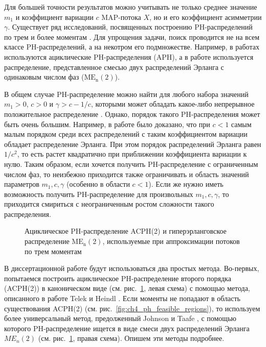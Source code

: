 Для большей точности результатов можно учитывать не только среднее значение $m_1$ и коэффициент вариации $c$ MAP-потока $X$, но и его коэффициент асимметрии $\gamma$. Существует ряд исследований, посвященных построению PH-распределений по трем и более моментам \cite{Osogami2006,Bobbio2005,Johnson1989,Telek2003,Horvath2013a,VandenBosch2000,Horvath2007,Schmickler1992}. Для упрощения задачи, поиск проводится не на всем классе PH-распределений, а на некотром его подмножестве. Например, в работах \cite{Bobbio2005,Telek2003} используются ациклические PH-распределения (APH), а в работе \cite{Johnson1989} используется распределение, представленное смесью двух распределений Эрланга с одинаковым числом фаз ($\text{ME}_\text{n}(2)$).

В общем случае PH-распределение можно найти для любого набора значений $m_1 > 0$, $c > 0$ и $\gamma > c - 1/c$, которыми может обладать какое-либо непрерывное положительное распределение \cite{Johnson1989}. Однако, порядок такого PH-распределения может быть очень большим. Например, в работе \cite{Aldous1987} было доказано, что при $c < 1$ самым малым порядком среди всех распределений с таким коэффициентом вариации  обладает распределение Эрланга. При этом порядок распределений Эрланга равен $1 / c^2$, то есть растет квадратично при приближении коэффициента вариации к нулю. Таким образом, если хочется получить PH-распределение с ограниченным числом фаз, то неизбежно приходится также ограничивать и область значений параметров $m_1, c, \gamma$ (особенно в области $c < 1$). Если же нужно иметь возможность получить PH-распределение для произвольных $m_1, c, \gamma$, то приходится смириться с неограниченным ростом сложности такого распределения.

\begin{figure}[h]
  \caption{Ациклическое PH-распределение ACPH(2) и гиперэрланговское распределение $\text{ME}_\text{n}(2)$, используемые при аппроксимации потоков по трем моментам}
  \label{fig:ch4_ph3}
\end{figure}

В диссертационной работе будут использоваться два простых метода. Во-первых, попытаемся построить ациклическое PH-распределение второго порядка (ACPH(2)) в каноническом виде (см. рис.~\ref{fig:ch4_ph3}, левая схема) с помощью метода, описанного в работе Telek и Heindl \cite{Telek2003}. Если моменты не попадают в область существования ACPH(2) (см. рис.~\ref{fig:ch4_ph_feasible_regions}), то используем более универсальный метод, предолженный Johnson и Taafe \cite{Johnson1989}, с помощью которого PH-распределение ищется в виде смеси двух распределений Эрланга $ME_n(2)$ (см. рис.~\ref{fig:ch4_ph3}, правая схема). Опишем эти методы подробнее.

